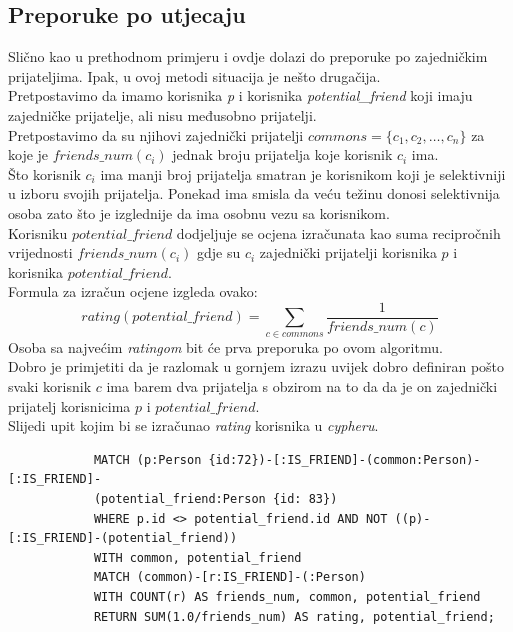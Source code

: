\documentclass[titlepage, 12pt]{scrartcl}
\begin{document}
	\subsection*{Preporuke po utjecaju}
	Slično kao u prethodnom primjeru i ovdje dolazi do preporuke po zajedničkim prijateljima. Ipak, u ovoj metodi situacija je nešto drugačija. \\
	Pretpostavimo da imamo korisnika \emph{p} i korisnika \emph{potential\_friend} koji imaju zajedničke prijatelje, ali nisu međusobno prijatelji. \\
	Pretpostavimo da su njihovi zajednički prijatelji $commons = \{c_1, c_2, \dots, c_n\}$ za koje je $friends\_num(c_i)$ jednak broju prijatelja koje korisnik $c_i$ ima. \\
	Što korisnik $c_i$ ima manji broj prijatelja smatran je korisnikom koji je selektivniji u izboru svojih prijatelja. Ponekad ima smisla da veću težinu donosi selektivnija osoba zato što je izglednije da ima osobnu vezu sa korisnikom. \\
	Korisniku $potential\_friend$ dodjeljuje se ocjena izračunata kao suma recipročnih vrijednosti $friends\_num(c_i)$ gdje su $c_i$ zajednički prijatelji korisnika $p$ i korisnika $potential\_friend$. \\
	Formula za izračun ocjene izgleda ovako:
	\begin{equation*}
		rating(potential\_friend) = \sum_{c \in commons} \frac{1}{friends\_num(c)}
	\end{equation*}
	Osoba sa najvećim \emph{ratingom} bit će prva preporuka po ovom algoritmu. \\
	Dobro je primjetiti da je razlomak u gornjem izrazu uvijek dobro definiran pošto svaki korisnik $c$ ima barem dva prijatelja s obzirom na to da da je on zajednički prijatelj korisnicima $p$ i $potential\_friend$. \\
	Slijedi upit kojim bi se izračunao \emph{rating} korisnika u \emph{cypheru}.
	
	\begin{samepage}
		\begin{verbatim}
			MATCH (p:Person {id:72})-[:IS_FRIEND]-(common:Person)-[:IS_FRIEND]-
			(potential_friend:Person {id: 83}) 
			WHERE p.id <> potential_friend.id AND NOT ((p)-[:IS_FRIEND]-(potential_friend)) 
			WITH common, potential_friend
			MATCH (common)-[r:IS_FRIEND]-(:Person)
			WITH COUNT(r) AS friends_num, common, potential_friend
			RETURN SUM(1.0/friends_num) AS rating, potential_friend;
		\end{verbatim}
	\end{samepage}
	
\end{document}
